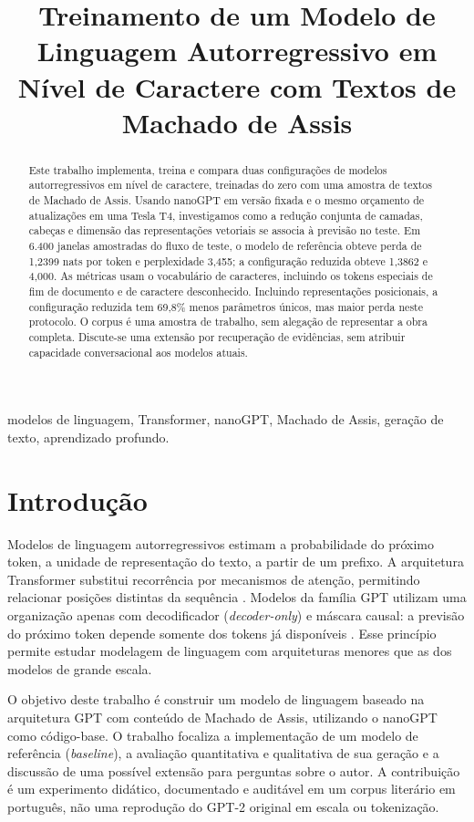 \documentclass[conference]{IEEEtran}
\title{Treinamento de um Modelo de Linguagem Autorregressivo em Nível de Caractere com Textos de Machado de Assis}
\author{%
  \IEEEauthorblockN{FABRICIO FERNANDES SANTANA}
  \IEEEauthorblockA{Departamento de Ciência da Computação\\
  Universidade de Brasília\\
  Matrícula: 262114527}
}
\begin{document}
\maketitle

\begin{abstract}
Este trabalho implementa, treina e compara duas configurações de modelos autorregressivos em nível de caractere, treinadas do zero com uma amostra de textos de Machado de Assis. Usando nanoGPT em versão fixada e o mesmo orçamento de atualizações em uma Tesla T4, investigamos como a redução conjunta de camadas, cabeças e dimensão das representações vetoriais se associa à previsão no teste. Em 6.400 janelas amostradas do fluxo de teste, o modelo de referência obteve perda de 1,2399 nats por token e perplexidade 3,455; a configuração reduzida obteve 1,3862 e 4,000. As métricas usam o vocabulário de caracteres, incluindo os tokens especiais de fim de documento e de caractere desconhecido. Incluindo representações posicionais, a configuração reduzida tem 69,8\% menos parâmetros únicos, mas maior perda neste protocolo. O corpus é uma amostra de trabalho, sem alegação de representar a obra completa. Discute-se uma extensão por recuperação de evidências, sem atribuir capacidade conversacional aos modelos atuais.
\end{abstract}

\begin{IEEEkeywords}
modelos de linguagem, Transformer, nanoGPT, Machado de Assis, geração de texto, aprendizado profundo.
\end{IEEEkeywords}

\section{Introdução}

Modelos de linguagem autorregressivos estimam a probabilidade do próximo token, a unidade de representação do texto, a partir de um prefixo. A arquitetura Transformer substitui recorrência por mecanismos de atenção, permitindo relacionar posições distintas da sequência \cite{vaswani2017}. Modelos da família GPT utilizam uma organização apenas com decodificador (\textit{decoder-only}) e máscara causal: a previsão do próximo token depende somente dos tokens já disponíveis \cite{radford2019}. Esse princípio permite estudar modelagem de linguagem com arquiteturas menores que as dos modelos de grande escala.

O objetivo deste trabalho é construir um modelo de linguagem baseado na arquitetura GPT com conteúdo de Machado de Assis, utilizando o nanoGPT como código-base. O trabalho focaliza a implementação de um modelo de referência (\textit{baseline}), a avaliação quantitativa e qualitativa de sua geração e a discussão de uma possível extensão para perguntas sobre o autor. A contribuição é um experimento didático, documentado e auditável em um corpus literário em português, não uma reprodução do GPT-2 original em escala ou tokenização.
\end{document}

